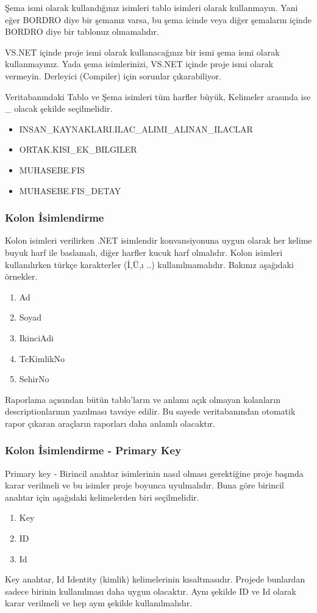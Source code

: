 \documentclass[10pt,a4paper,draft]{article}
\begin{document}
Şema ismi olarak kullandığınız isimleri tablo isimleri olarak kullanmayın. 
Yani eğer BORDRO diye bir şemanız varsa,	bu şema icinde veya 
diğer şemaların içinde BORDRO diye bir tablonuz olmamalıdır.

VS.NET içinde proje ismi olarak kullanacağınız bir ismi şema ismi  olarak kullanmayınız.
Yada şema isimlerinizi, VS.NET içinde	proje ismi  olarak vermeyin.
Derleyici (Compiler)  için sorunlar çıkarabiliyor.		 


Veritabanındaki Tablo ve Şema isimleri tüm harfler büyük, Kelimeler arasında ise \_ olacak şekilde seçilmelidir.

\begin{itemize}
\item INSAN\_KAYNAKLARI.ILAC\_ALIMI\_ALINAN\_ILACLAR		 
\item ORTAK.KISI\_EK\_BILGILER		 
\item MUHASEBE.FIS		 
\item MUHASEBE.FIS\_DETAY 

\end{itemize}


\subsubsection{Kolon İsimlendirme}
Kolon isimleri verilirken .NET isimlendir konvansiyonuna uygun olarak her kelime buyuk harf ile baslamalı,
diğer harfler kucuk harf olmalıdır.
Kolon isimleri kullanılırken türkçe karakterler (İ,Ü,ı ..) kullanılmamalıdır.
Bakınız aşağıdaki örnekler.


\begin{enumerate}
\item Ad
\item Soyad
\item IkinciAdi
\item TcKimlikNo
\item SehirNo
\end{enumerate}

Raporlama açısından bütün tablo'ların ve anlamı açık olmayan kolanların descriptionlarının yazılması tavsiye edilir.
Bu sayede veritabanından otomatik rapor çıkaran araçların raporları daha anlamlı olacaktır.
	
  
  
\subsubsection{Kolon İsimlendirme - Primary Key}
Primary key - Birincil anahtar isimlerinin nasıl olması gerektiğine proje başında karar verilmeli ve bu isimler
proje boyunca uyulmalıdır.
Buna göre birincil anahtar için aşağıdaki kelimelerden biri seçilmelidir.
\begin{enumerate}
\item Key
\item ID
\item Id
\end{enumerate}
Key anahtar, Id Identity (kimlik) kelimelerinin kısaltmasıdır.
Projede bunlardan sadece birinin kullanılması daha uygun olacaktır.
Aynı şekilde ID ve Id olarak karar verilmeli ve hep aynı şekilde kullanılmalıdır.
\end{document}

